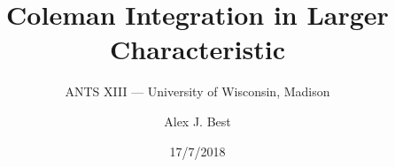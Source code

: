 


\usepackage{amsmath, amssymb, amsfonts, graphicx}
\usepackage{tikz-cd}
\usepackage[utf8]{inputenc}
\usepackage[T1]{fontenc}
\usepackage[english]{babel}

\usepackage{kbordermatrix}
\renewcommand{\kbldelim}{(}%
\renewcommand{\kbrdelim}{)}%

\usepackage{amsthm}
\theoremstyle{plain}
\newtheorem{theorem}{Theorem}[section]
\newtheorem{corollary}[theorem]{Corollary}
\newtheorem{lemma}[theorem]{Lemma}
\newtheorem{algorithm}[theorem]{Algorithm}
\newtheorem{proposition}[theorem]{Proposition}
\newtheorem{claim}[theorem]{Claim}
\newtheorem{fact}[theorem]{Fact}
\newtheorem{conjecture}[theorem]{Conjecture}
\theoremstyle{definition}
\newtheorem{definition}[theorem]{Definition}
\theoremstyle{definition}
\newtheorem{remark}[theorem]{Remark}
\newtheorem{observation}[theorem]{Observation}
\theoremstyle{definition}
\newtheorem{example}[theorem]{Example}
\newtheorem{question}[theorem]{Question}
\newcommand{\term}[1]{\textbf{#1}}

\newcommand{\diff}{\mathop{}\!\mathrm{d}}
\newcommand{\NN}{\mathbf{N}}
\newcommand{\ZZ}{\mathbf{Z}}
\newcommand{\QQ}{\mathbf{Q}}
\newcommand{\FF}{\mathbf{F}}
\newcommand{\lt}{<}
\newcommand{\gt}{>}
\newcommand{\amp}{&}




\author{Alex J. Best}
\subtitle{ANTS XIII --- University of Wisconsin, Madison}
\date{17/7/2018}
\title{Coleman Integration in Larger Characteristic}


\maketitle



